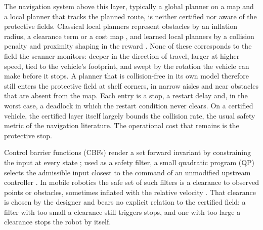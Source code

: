\documentclass[11pt]{article}
\theoremstyle{definition}
\begin{document}
The navigation system above this layer, typically a global planner on a map and a local planner that
tracks the planned route, is neither certified nor aware of the protective fields. Classical local
planners represent obstacles by an inflation radius, a clearance term or a cost map
\citep{fox1997dwa,macenski2023rpp,williams2017mppi}, and learned local planners by a collision penalty
and proximity shaping in the reward \citep{le2024review,taheri2024ppo,cai2025agv}. None of these
corresponds to the field the scanner monitors: deeper in the direction of travel, larger at higher
speed, tied to the vehicle's footprint, and swept by the rotation the vehicle can make before it stops.
A planner that is collision-free in its own model therefore still enters the protective field at shelf
corners, in narrow aisles and near obstacles that are absent from the map. Each entry is a stop, a restart delay and, in the worst case, a deadlock in which the restart condition never clears. On a certified vehicle, the certified layer itself largely bounds the collision rate, the usual safety metric of the navigation literature. The operational cost that remains is the protective stop.

Control barrier functions (CBFs) render a set forward invariant by constraining the input at every
state \citep{ames2017cbfqp,ames2019cbf,garg2024advances}; used as a safety filter, a small quadratic program (QP) selects
the admissible input closest to the command of an unmodified upstream controller
\citep{wang2022ensuring,wabersich2023safety}. In mobile robotics the safe set of such filters is a
clearance to observed points or obstacles, sometimes inflated with the relative velocity
\citep{raja2024ogmcbf,zeng2025relvel}. That clearance is chosen by the designer and bears no explicit
relation to the certified field: a filter with too small a clearance still triggers stops, and one with
too large a clearance stops the robot by itself.
\end{document}
